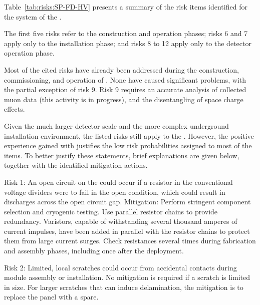 Table~\ref{tab:risks:SP-FD-HV} presents a summary of the risk items identified for the  system of  the  . 



The first five risks refer to the construction and operation phases; risks 6 and 7 apply only to the installation phase; and risks 8 to 12 apply only to the  detector operation phase. %


Most of the cited risks have already been addressed during the construction, commissioning, and operation of . 
None have caused significant problems, with the partial exception of risk 9. %
Risk 9 requires an accurate analysis of collected muon data (this activity is in progress), and the disentangling of space charge effects. 


Given the much larger detector scale and the more complex underground installation environment, the listed risks still %
apply to the . However, the positive experience gained with  justifies the low risk probabilities assigned to most of the items.  To better justify these statements, brief explanations are given below, together with the identified mitigation actions.

Risk 1: An open circuit on the  could occur if a resistor in the conventional voltage dividers were to fail in the open condition, which %
could result in  discharges across the open circuit gap. Mitigation: Perform stringent component selection and cryogenic testing. Use parallel resistor chains to provide redundancy. Varistors, capable of withstanding several thousand amperes of current impulses, have been added in parallel with the resistor chains to protect them from large current surges. Check resistances %
several times during  fabrication and assembly phases, including once after the  deployment.   

Risk 2: Limited, local scratches could %
occur from accidental contacts during module assembly or installation. No mitigation is required if a scratch is limited in size. For larger scratches that can induce delamination, the mitigation is to replace the panel with a spare. 

